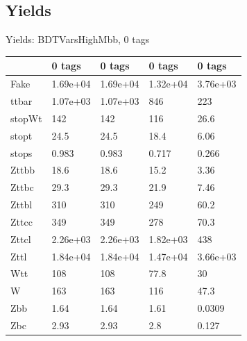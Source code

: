 
\subsection{Yields}

\begin{frame}{Yields: BDTVarsHighMbb, 0 tags}
\begin{center}
  \begin{tabular}{l| >{\centering\let\newline\\\arraybackslash\hspace{0pt}}m{1.4cm}| >{\centering\let\newline\\\arraybackslash\hspace{0pt}}m{1.4cm}| >{\centering\let\newline\\\arraybackslash\hspace{0pt}}m{1.4cm}| >{\centering\let\newline\\\arraybackslash\hspace{0pt}}m{1.4cm}}
    & 0 tags & 0 tags & 0 tags & 0 tags \\
 \hline \hline
    Fake& 1.69e+04 & 1.69e+04 & 1.32e+04 & 3.76e+03 \\
 \hline
    ttbar& 1.07e+03 & 1.07e+03 & 846 & 223 \\
 \hline
    stopWt& 142 & 142 & 116 & 26.6 \\
 \hline
    stopt& 24.5 & 24.5 & 18.4 & 6.06 \\
 \hline
    stops& 0.983 & 0.983 & 0.717 & 0.266 \\
 \hline
    Zttbb& 18.6 & 18.6 & 15.2 & 3.36 \\
 \hline
    Zttbc& 29.3 & 29.3 & 21.9 & 7.46 \\
 \hline
    Zttbl& 310 & 310 & 249 & 60.2 \\
 \hline
    Zttcc& 349 & 349 & 278 & 70.3 \\
 \hline
    Zttcl& 2.26e+03 & 2.26e+03 & 1.82e+03 & 438 \\
 \hline
    Zttl& 1.84e+04 & 1.84e+04 & 1.47e+04 & 3.66e+03 \\
 \hline
    Wtt& 108 & 108 & 77.8 & 30 \\
 \hline
    W& 163 & 163 & 116 & 47.3 \\
 \hline
    Zbb& 1.64 & 1.64 & 1.61 & 0.0309 \\
 \hline
    Zbc& 2.93 & 2.93 & 2.8 & 0.127 \\
 \hline

\end{tabular}
\end{center}
\end{frame}

